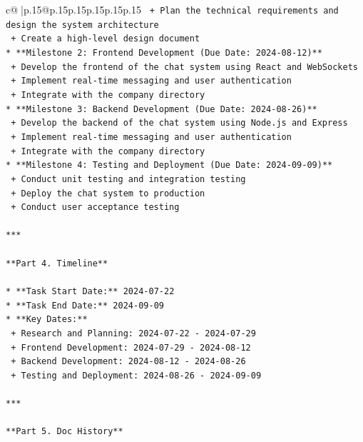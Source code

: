 \documentclass{article}
\begin{document}
{\begin{supertabular}{c@{$\;$}|p{.15\linewidth}@{}p{.15\linewidth}p{.15\linewidth}p{.15\linewidth}p{.15\linewidth}p{.15\linewidth}}
{{{\texttt{	+ Plan the technical requirements and design the system architecture} \\
\texttt{	+ Create a high{-}level design document} \\
\texttt{* **Milestone 2: Frontend Development (Due Date: 2024{-}08{-}12)**} \\
\texttt{	+ Develop the frontend of the chat system using React and WebSockets} \\
\texttt{	+ Implement real{-}time messaging and user authentication} \\
\texttt{	+ Integrate with the company directory} \\
\texttt{* **Milestone 3: Backend Development (Due Date: 2024{-}08{-}26)**} \\
\texttt{	+ Develop the backend of the chat system using Node.js and Express} \\
\texttt{	+ Implement real{-}time messaging and user authentication} \\
\texttt{	+ Integrate with the company directory} \\
\texttt{* **Milestone 4: Testing and Deployment (Due Date: 2024{-}09{-}09)**} \\
\texttt{	+ Conduct unit testing and integration testing} \\
\texttt{	+ Deploy the chat system to production} \\
\texttt{	+ Conduct user acceptance testing} \\
\\ 
\texttt{***} \\
\\ 
\texttt{**Part 4. Timeline**} \\
\\ 
\texttt{* **Task Start Date:** 2024{-}07{-}22} \\
\texttt{* **Task End Date:** 2024{-}09{-}09} \\
\texttt{* **Key Dates:**} \\
\texttt{	+ Research and Planning: 2024{-}07{-}22 {-} 2024{-}07{-}29} \\
\texttt{	+ Frontend Development: 2024{-}07{-}29 {-} 2024{-}08{-}12} \\
\texttt{	+ Backend Development: 2024{-}08{-}12 {-} 2024{-}08{-}26} \\
\texttt{	+ Testing and Deployment: 2024{-}08{-}26 {-} 2024{-}09{-}09} \\
\\ 
\texttt{***} \\
\\ 
\texttt{**Part 5. Doc History**} \\
}}}
\end{supertabular}}
\end{document}
